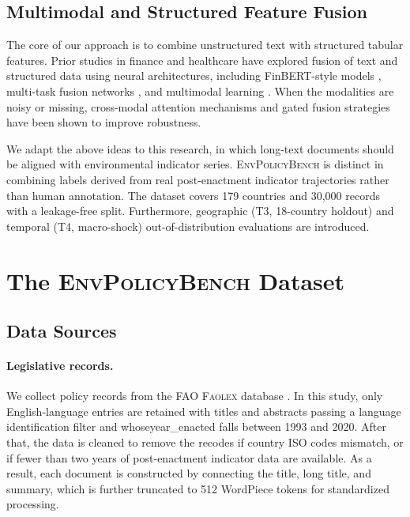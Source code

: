 \documentclass[11pt]{article}
\newcommand{\bench}{\textsc{EnvPolicyBench}}
\begin{document}
\subsection{Multimodal and Structured Feature Fusion}

The core of our approach is to combine  unstructured text with structured tabular features. Prior studies in finance and healthcare have explored fusion of text and structured data using neural architectures, including FinBERT-style models \citep{yang2020finbert}, multi-task fusion networks \citep{sawhney2021finmtl}, and multimodal learning \citep{khadanga2019sensefusion}. When the modalities are noisy or missing, cross-modal attention mechanisms \citep{tsai2019multimodal} and gated fusion strategies \citep{arevalo2017gated} have been shown to improve robustness.

We adapt the above ideas to this research, in which long-text documents should be aligned with environmental indicator series. \bench{} is distinct in combining labels derived from real post-enactment indicator trajectories rather than human annotation. The dataset covers 179 countries and 30{,}000 records with a leakage-free split. Furthermore, geographic (T3, 18-country holdout) and temporal (T4, macro-shock) out-of-distribution evaluations are introduced. 


\section{The \bench{} Dataset}
\label{sec:dataset}

\subsection{Data Sources}
\label{sec:data-sources}

\paragraph{Legislative records.}
We collect policy records from the FAO \textsc{Faolex} database \citep{faolex2024}.  In this study,  only English-language entries are retained with titles and abstracts passing a language identification filter and whoseyear\_enacted falls between 1993 and 2020. After that, the data is cleaned to remove the recodes if country ISO codes mismatch, or if fewer than two years of post-enactment indicator data are available. As a result, each document is constructed by connecting the title, long title, and summary, which is further truncated to 512 WordPiece tokens for standardized processing.
\end{document}
